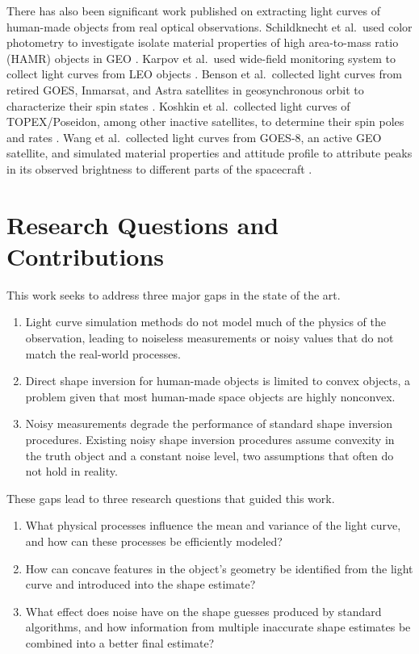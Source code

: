 There has also been significant work published on extracting light curves of human-made objects from real optical observations. Schildknecht et al.\ used color photometry to investigate isolate material properties of high area-to-mass ratio (HAMR) objects in GEO \cite{schildknecht2008}. Karpov et al.\ used wide-field monitoring system to collect light curves from LEO objects \cite{karpov2016}. Benson et al.\ collected light curves from retired GOES, Inmarsat, and Astra satellites in geosynchronous orbit to characterize their spin states \cite{benson2017}. Koshkin et al.\ collected light curves of TOPEX/Poseidon, among other inactive satellites, to determine their spin poles and rates \cite{koshkin2018}. Wang et al.\ collected light curves from GOES-8, an active GEO satellite, and simulated material properties and attitude profile to attribute peaks in its observed brightness to different parts of the spacecraft \cite{wang2018}.

\section{Research Questions and Contributions}

This work seeks to address three major gaps in the state of the art.

\begin{enumerate}
    \item Light curve simulation methods do not model much of the physics of the observation, leading to noiseless measurements or noisy values that do not match the real-world processes.
    \item Direct shape inversion for human-made objects is limited to convex objects, a problem given that most human-made space objects are highly nonconvex.
    \item Noisy measurements degrade the performance of standard shape inversion procedures. Existing noisy shape inversion procedures assume convexity in the truth object and a constant noise level, two assumptions that often do not hold in reality. 
\end{enumerate}

These gaps lead to three research questions that guided this work.

\begin{enumerate}
    \item What physical processes influence the mean and variance of the light curve, and how can these processes be efficiently modeled?
    \item How can concave features in the object's geometry be identified from the light curve and introduced into the shape estimate?
    \item What effect does noise have on the shape guesses produced by standard algorithms, and how information from multiple inaccurate shape estimates be combined into a better final estimate?
\end{enumerate}

